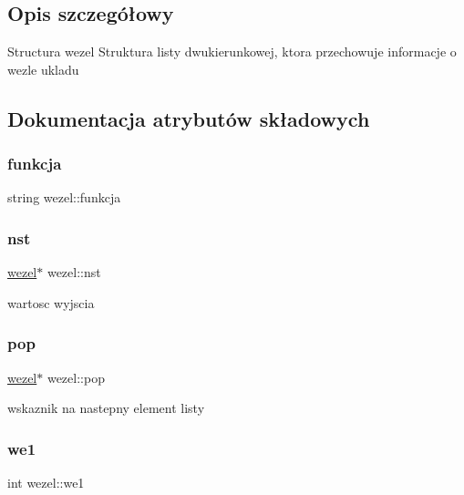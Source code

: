 \subsection{Opis szczegółowy}
Structura wezel Struktura listy dwukierunkowej, ktora przechowuje informacje o wezle ukladu 

\subsection{Dokumentacja atrybutów składowych}
\mbox{\label{structwezel_a148a644d01c3a8901d86c5b2a3d8537e}} 
\subsubsection{\texorpdfstring{funkcja}{funkcja}}
{\footnotesize\ttfamily string wezel\+::funkcja}

\mbox{\label{structwezel_aabe580e837a6da48ce1f49fcc7438372}} 
\subsubsection{\texorpdfstring{nst}{nst}}
{\footnotesize\ttfamily \mbox{\hyperlink{structwezel}{wezel}}$\ast$ wezel\+::nst}



wartosc wyjscia 

\mbox{\label{structwezel_ab2eaee46825e632254db79066ad6821c}} 
\subsubsection{\texorpdfstring{pop}{pop}}
{\footnotesize\ttfamily \mbox{\hyperlink{structwezel}{wezel}}$\ast$ wezel\+::pop}



wskaznik na nastepny element listy 

\mbox{\label{structwezel_a5f77c2d18eb7ef9a6cc0ec4db11a0530}} 
\subsubsection{\texorpdfstring{we1}{we1}}
{\footnotesize\ttfamily int wezel\+::we1}



